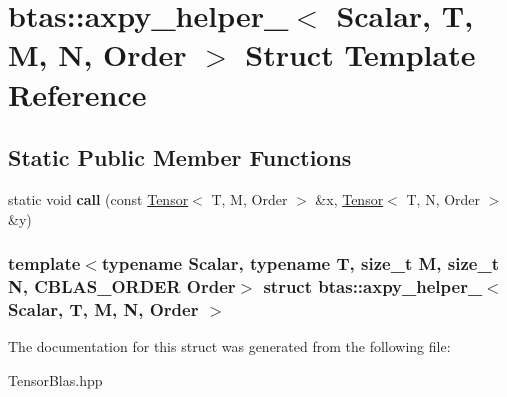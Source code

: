 \hypertarget{structbtas_1_1axpy__helper__}{
\section{btas::axpy\_\-helper\_\-$<$ Scalar, T, M, N, Order $>$ Struct Template Reference}
\label{structbtas_1_1axpy__helper__}
}
\subsection*{Static Public Member Functions}
\begin{DoxyCompactItemize}
\item 
\hypertarget{structbtas_1_1axpy__helper___a9af6b8e5cdea57824e6c4f19d297077d}{
static void {\bfseries call} (const \hyperlink{classbtas_1_1_tensor}{Tensor}$<$ T, M, Order $>$ \&x, \hyperlink{classbtas_1_1_tensor}{Tensor}$<$ T, N, Order $>$ \&y)}
\label{structbtas_1_1axpy__helper___a9af6b8e5cdea57824e6c4f19d297077d}

\end{DoxyCompactItemize}
\subsubsection*{template$<$typename Scalar, typename T, size\_\-t M, size\_\-t N, CBLAS\_\-ORDER Order$>$ struct btas::axpy\_\-helper\_\-$<$ Scalar, T, M, N, Order $>$}



The documentation for this struct was generated from the following file:\begin{DoxyCompactItemize}
\item 
TensorBlas.hpp\end{DoxyCompactItemize}

